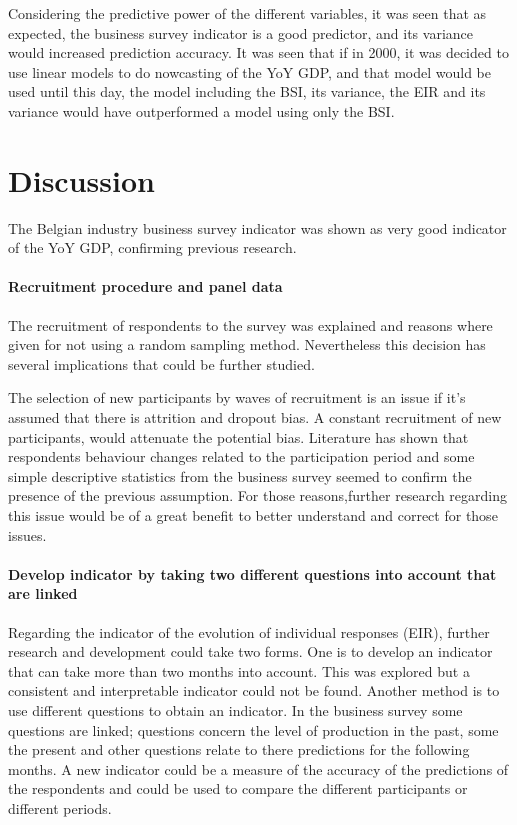 \documentclass[12pt,a4paper,oneside]{book}
\begin{document}
Considering the predictive power of the different variables, it was seen that as expected, the business survey indicator is a good predictor, and its variance would increased prediction accuracy.
It was seen that if in 2000, it was decided to use linear models to do nowcasting of the YoY GDP, and that model would be used until this day, the model including the BSI, its variance, the EIR and its variance would have outperformed a model using only the BSI.


\chapter{Discussion}

The Belgian industry business survey indicator was shown as very good indicator of the YoY GDP, confirming previous research.


\subsubsection{Recruitment procedure and panel data}

The recruitment of respondents to the survey was explained and reasons where given for not using a random sampling method. Nevertheless this decision has several implications that could be further studied.

The selection of new participants by waves of recruitment is an issue if it's assumed that there is attrition and dropout bias.
A constant recruitment of new participants, would attenuate the potential bias. 
Literature has shown that respondents behaviour changes related to the participation period and some simple descriptive statistics from the business survey seemed to confirm the presence of the previous assumption. For those reasons,further research regarding this issue would be of a great benefit to better understand and correct for those issues.

\subsubsection{Develop indicator by taking two different questions into account that are linked}

Regarding the indicator of the evolution of individual responses (EIR), further research and development could take two forms. 
One is to develop an indicator that can take more than two months into account. This was explored but a consistent and interpretable indicator could not be found. 
Another method is to use different questions to obtain an indicator. In the business survey some questions are linked; questions concern the level of production in the past, some the present and other questions relate to there predictions for the following months. 
A new indicator could be a measure of the accuracy of the predictions of the respondents and could be used to compare the different participants or different periods.
\end{document}
